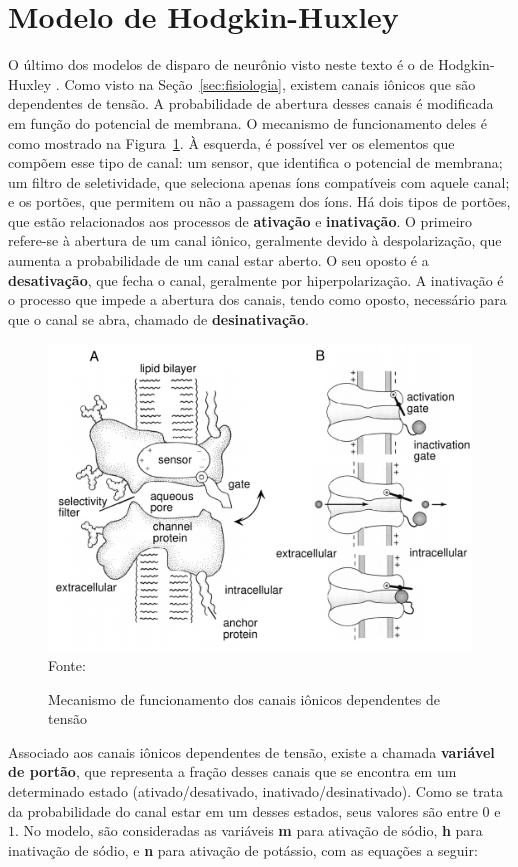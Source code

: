 \section{Modelo de Hodgkin-Huxley}\label{sec:modelohh}
O último dos modelos de disparo de neurônio visto neste texto é o de Hodgkin-Huxley \cite{hodgkin_quantitative_1952}. Como visto na Seção~\ref{sec:fisiologia}, existem canais iônicos que são dependentes de tensão. A probabilidade de abertura desses canais é modificada em função do potencial de membrana. O mecanismo de funcionamento deles é como mostrado na Figura~\ref{fig:canais}. À esquerda, é possível ver os elementos que compõem esse tipo de canal: um sensor, que identifica o potencial de membrana; um filtro de seletividade, que seleciona apenas íons compatíveis com aquele canal; e os portões, que permitem ou não a passagem dos íons. Há dois tipos de portões, que estão relacionados aos processos de \textbf{ativação} e \textbf{inativação}. O primeiro refere-se à abertura de um canal iônico, geralmente devido à despolarização, que aumenta a probabilidade de um canal estar aberto. O seu oposto é a \textbf{desativação}, que fecha o canal, geralmente por hiperpolarização. A inativação é o processo que impede a abertura dos canais, tendo como oposto, necessário para que o canal se abra, chamado de \textbf{desinativação}.
\cite{miller_introductory_2018}
\begin{figure}[htb!]
	\centering
	\caption{Mecanismo de funcionamento dos canais iônicos dependentes de tensão}
	\label{fig:canais}
	\includegraphics[width=0.6\linewidth]{figs/canais}\\
	\small{Fonte: \cite{dayan_theoretical_2001}}
\end{figure}
Associado aos canais iônicos dependentes de tensão, existe a chamada \textbf{variável de portão}, que representa a fração desses canais que se encontra em um determinado estado (ativado/desativado, inativado/desinativado). Como se trata da probabilidade do canal estar em um desses estados, seus valores são entre $0$ e $1$. No modelo, são consideradas as variáveis \textbf{m} para ativação de sódio, \textbf{h} para inativação de sódio, e \textbf{n} para ativação de potássio, com as equações a seguir:
